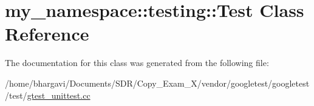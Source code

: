 \hypertarget{classmy__namespace_1_1testing_1_1_test}{}\section{my\+\_\+namespace\+:\+:testing\+:\+:Test Class Reference}
\label{classmy__namespace_1_1testing_1_1_test}


The documentation for this class was generated from the following file\+:\begin{DoxyCompactItemize}
\item 
/home/bhargavi/\+Documents/\+S\+D\+R/\+Copy\+\_\+\+Exam\+\_\+X/vendor/googletest/googletest/test/\hyperlink{gtest__unittest_8cc}{gtest\+\_\+unittest.\+cc}\end{DoxyCompactItemize}
